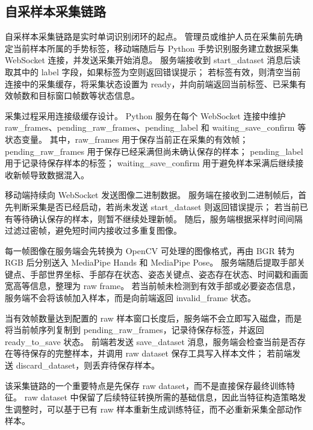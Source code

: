 
\subsection{自采样本采集链路}




自采样本采集链路是实时单词识别闭环的起点。
管理员或维护人员在采集前先确定当前样本所属的手势标签，移动端随后与 Python 手势识别服务建立数据采集 WebSocket 连接，并发送采集开始消息。
服务端接收到 start\_dataset 消息后读取其中的 label 字段，如果标签为空则返回错误提示；
若标签有效，则清空当前连接中的采集缓存，将采集状态设置为 ready，并向前端返回当前标签、已采集有效帧数和目标窗口帧数等状态信息。

采集过程采用连接级缓存设计。
Python 服务在每个 WebSocket 连接中维护 raw\_frames、pending\_raw\_frames、pending\_label 和 waiting\_save\_confirm 等状态变量。
其中，raw\_frames 用于保存当前正在采集的有效帧；
pending\_raw\_frames 用于保存已经采满但尚未确认保存的样本；
pending\_label 用于记录待保存样本的标签；
waiting\_save\_confirm 用于避免样本采满后继续接收新帧导致数据混入。

移动端持续向 WebSocket 发送图像二进制数据。
服务端在接收到二进制帧后，首先判断采集是否已经启动，若尚未发送 start\_dataset 则返回错误提示；
若当前已有等待确认保存的样本，则暂不继续处理新帧。
随后，服务端根据采样时间间隔过滤过密帧，避免短时间内接收过多重复图像。

每一帧图像在服务端会先转换为 OpenCV 可处理的图像格式，再由 BGR 转为 RGB 后分别送入 MediaPipe Hands 和 MediaPipe Pose。
服务端随后提取手部关键点、手部世界坐标、手部存在状态、姿态关键点、姿态存在状态、时间戳和画面宽高等信息，整理为 raw frame。
若当前帧未检测到有效手部或必要姿态信息，服务端不会将该帧加入样本，而是向前端返回 invalid\_frame 状态。

当有效帧数量达到配置的 raw 样本窗口长度后，服务端不会立即写入磁盘，而是将当前帧序列复制到 pending\_raw\_frames，记录待保存标签，并返回 ready\_to\_save 状态。
前端若发送 save\_dataset 消息，服务端会检查当前是否存在等待保存的完整样本，并调用 raw dataset 保存工具写入样本文件；
若前端发送 discard\_dataset，则丢弃待保存样本。

该采集链路的一个重要特点是先保存 raw dataset，而不是直接保存最终训练特征。
raw dataset 中保留了后续特征转换所需的基础信息，因此当特征构造策略发生调整时，可以基于已有 raw 样本重新生成训练特征，而不必重新采集全部动作样本。
